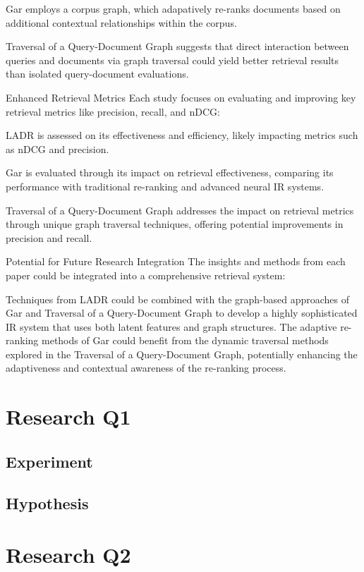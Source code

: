 \documentclass[sigconf,authorversion,nonacm]{acmart}
\begin{document}
Gar employs a corpus graph, which adapatively re-ranks documents based on additional
contextual relationships within the corpus.

Traversal of a Query-Document Graph suggests that direct interaction between queries and
documents via graph traversal could yield better retrieval results than isolated
query-document evaluations.

Enhanced Retrieval Metrics Each study focuses on evaluating and improving key retrieval
metrics like precision, recall, and nDCG:

LADR is assessed on its effectiveness and efficiency, likely impacting metrics such as nDCG
and precision.

Gar is evaluated through its impact on retrieval effectiveness, comparing its performance
with traditional re-ranking and advanced neural IR systems.

Traversal of a Query-Document Graph addresses the impact on retrieval metrics through unique
graph traversal techniques, offering potential improvements in precision and recall.

Potential for Future Research Integration The insights and methods from each paper could be
integrated into a comprehensive retrieval system:

Techniques from LADR could be combined with the graph-based approaches of Gar and Traversal
of a Query-Document Graph to develop a highly sophisticated IR system that uses both latent
features and graph structures. The adaptive re-ranking methods of Gar could benefit from the
dynamic traversal methods explored in the Traversal of a Query-Document Graph, potentially
enhancing the adaptiveness and contextual awareness of the re-ranking process.

\section{Research Q1}

\subsection{Experiment}

\subsection{Hypothesis}

\section{Research Q2}
\end{document}
